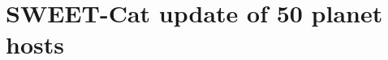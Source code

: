 \documentclass[fleqn]{fcup-thesis}
\begin{document}
\begin{preliminary}
\listoffigures


\end{preliminary}












\appendix

\chapter{SWEET-Cat update of 50 planet hosts}
\end{document}
